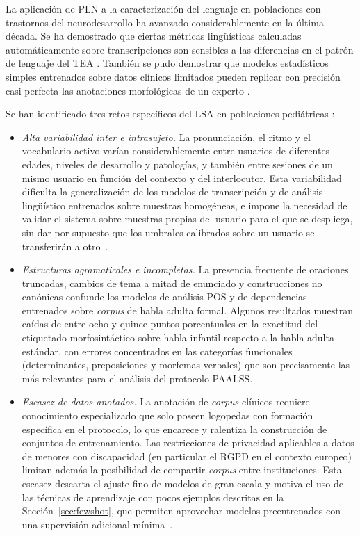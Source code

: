 La aplicación de \ac{PLN} a la caracterización del lenguaje en poblaciones con trastornos
del neurodesarrollo ha avanzado considerablemente en la última década. Se ha demostrado 
que ciertas métricas lingüísticas calculadas automáticamente sobre transcripciones son 
sensibles a las diferencias en el patrón de lenguaje del \ac{TEA} \cite{nlp_autism_automated}. 
También se pudo demostrar que modelos estadísticos simples entrenados sobre datos clínicos 
limitados pueden replicar con precisión casi perfecta las anotaciones morfológicas de un 
experto \cite{lsa_morphological_auto}.

Se han identificado tres retos específicos del LSA en poblaciones pediátricas \cite{lsa_swiss_benchmark}: 

\begin{itemize}
  \item \emph{Alta variabilidad inter e intrasujeto.} La pronunciación, el ritmo y el
  vocabulario activo varían considerablemente entre usuarios de diferentes edades, niveles
  de desarrollo y patologías, y también entre sesiones de un mismo usuario en función del
  contexto y del interlocutor. Esta variabilidad dificulta la generalización de los modelos
  de transcripción y de análisis lingüístico entrenados sobre muestras homogéneas, e impone
  la necesidad de validar el sistema sobre muestras propias del usuario para el que se
  despliega, sin dar por supuesto que los umbrales calibrados sobre un usuario se transferirán
  a otro~\cite{lsa_swiss_benchmark}.

  \item \emph{Estructuras agramaticales e incompletas.} La presencia frecuente de oraciones
  truncadas, cambios de tema a mitad de enunciado y construcciones no canónicas confunde los
  modelos de análisis \ac{POS} y de dependencias entrenados sobre \emph{corpus} de habla adulta
  formal. Algunos resultados muestran caídas de entre ocho y quince puntos porcentuales en la 
  exactitud del etiquetado morfosintáctico sobre habla infantil respecto a la habla adulta estándar, 
  con errores concentrados en las categorías funcionales (determinantes, preposiciones y morfemas 
  verbales) que son precisamente las más relevantes para el análisis del 
  protocolo \ac{PAALSS}\cite{lsa_swiss_benchmark}.

  \item \emph{Escasez de datos anotados.} La anotación de \emph{corpus} clínicos requiere
  conocimiento especializado que solo poseen logopedas con formación específica en el
  protocolo, lo que encarece y ralentiza la construcción de conjuntos de entrenamiento.
  Las restricciones de privacidad aplicables a datos de menores con discapacidad (en
  particular el \ac{RGPD} en el contexto europeo) limitan además la posibilidad de compartir
  \emph{corpus} entre instituciones. Esta escasez descarta el ajuste fino de modelos de gran escala
  y motiva el uso de las técnicas de aprendizaje con pocos ejemplos descritas en la
  Sección~\ref{sec:fewshot}, que permiten aprovechar modelos preentrenados con una
  supervisión adicional mínima~\cite{fewshot_clinical_nlp}.
\end{itemize}

